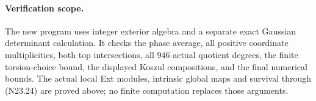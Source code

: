 \paragraph{Verification scope.}
The new program 
uses integer exterior algebra and a separate exact Gaussian
determinant calculation. It checks the phase average, all
positive coordinate multiplicities, both top intersections,
all $946$ actual quotient degrees, the finite torsion-choice bound,
the displayed Koszul compositions, and the final numerical bounds.
The actual local Ext modules, intrinsic global maps and survival
through (N23.24) are proved above; no finite computation replaces
those arguments.
